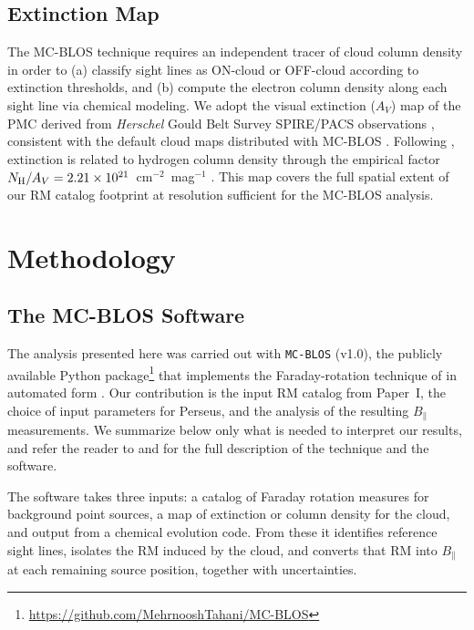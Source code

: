 \documentclass[twocolumn]{aastex701}
\begin{document}
\subsection{Extinction Map}

The MC-BLOS technique requires an independent tracer of cloud column density
in order to (a) classify sight lines as ON-cloud or OFF-cloud according to
extinction thresholds, and (b) compute the electron column density along each
sight line via chemical modeling. We adopt the visual extinction ($A_V$) map
of the PMC derived from \textit{Herschel} Gould Belt Survey SPIRE/PACS
observations \citep{andre2010}, consistent with the default cloud maps
distributed with MC-BLOS \citep{tahani2025mcblos}. Following
\citet{tahani2025mcblos}, extinction is related to hydrogen column density
through the empirical factor
$N_{\rm H}/A_V = 2.21 \times 10^{21}$~cm$^{-2}$~mag$^{-1}$
\citep{guver2009relation}. This map covers the full spatial extent of our RM
catalog footprint at resolution sufficient for the MC-BLOS analysis.

\section{Methodology}
  \label{sec:method}

  \subsection{The MC-BLOS Software}

  The analysis presented here was carried out with \texttt{MC-BLOS} (v1.0), the
  publicly available Python
  package\footnote{\url{https://github.com/MehrnooshTahani/MC-BLOS}} that
  implements the Faraday-rotation technique of \citet{tahani2018} in automated
  form \citep{tahani2025mcblos}. Our contribution is
  the input RM catalog from Paper~I, the choice of input parameters for Perseus,
  and the analysis of the resulting $B_\parallel$ measurements. We summarize
  below only what is needed to interpret our results, and refer the reader to
  \citet{tahani2018} and \citet{tahani2025mcblos} for the full description of
  the technique and the software.

  The software takes three inputs: a catalog of Faraday rotation measures for
  background point sources, a map of extinction or column density for the cloud,
  and output from a chemical evolution code. From these it identifies reference
  sight lines, isolates the RM induced by the cloud, and converts that RM into
  $B_\parallel$ at each remaining source position, together with uncertainties.
\end{document}
